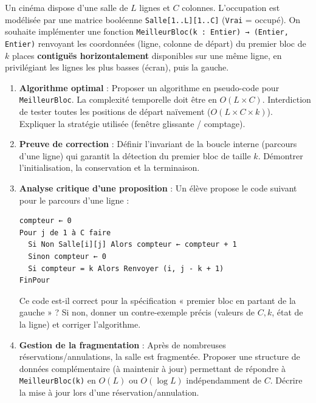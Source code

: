 \documentclass[11pt]{article}
\begin{document}
\begin{exercice}
Un cinéma dispose d'une salle de $L$ lignes et $C$ colonnes. L'occupation est modélisée par une matrice booléenne \texttt{Salle[1..L][1..C]} (\texttt{Vrai} = occupé). On souhaite implémenter une fonction \texttt{MeilleurBloc(k : Entier) → (Entier, Entier)} renvoyant les coordonnées (ligne, colonne de départ) du premier bloc de $k$ places \textbf{contiguës horizontalement} disponibles sur une même ligne, en privilégiant les lignes les plus basses (écran), puis la gauche.

\begin{enumerate}
\item \textbf{Algorithme optimal} : Proposer un algorithme en pseudo-code pour \texttt{MeilleurBloc}. La complexité temporelle doit être en $O(L \times C)$. Interdiction de tester toutes les positions de départ naïvement ($O(L \times C \times k)$). Expliquer la stratégie utilisée (fenêtre glissante / comptage).
\item \textbf{Preuve de correction} : Définir l'invariant de la boucle interne (parcours d'une ligne) qui garantit la détection du premier bloc de taille $k$. Démontrer l'initialisation, la conservation et la terminaison.
\item \textbf{Analyse critique d'une proposition} : Un élève propose le code suivant pour le parcours d'une ligne :
\begin{verbatim}
compteur ← 0
Pour j de 1 à C faire
  Si Non Salle[i][j] Alors compteur ← compteur + 1
  Sinon compteur ← 0
  Si compteur = k Alors Renvoyer (i, j - k + 1)
FinPour
\end{verbatim}
      Ce code est-il correct pour la spécification « premier bloc en partant de la gauche » ? Si non, donner un contre-exemple précis (valeurs de $C, k$, état de la ligne) et corriger l'algorithme.
\item \textbf{Gestion de la fragmentation} : Après de nombreuses réservations/annulations, la salle est fragmentée. Proposer une structure de données complémentaire (à maintenir à jour) permettant de répondre à \texttt{MeilleurBloc(k)} en $O(L)$ ou $O(\log L)$ indépendamment de $C$. Décrire la mise à jour lors d'une réservation/annulation.
\end{enumerate}
\end{exercice}
\end{document}
